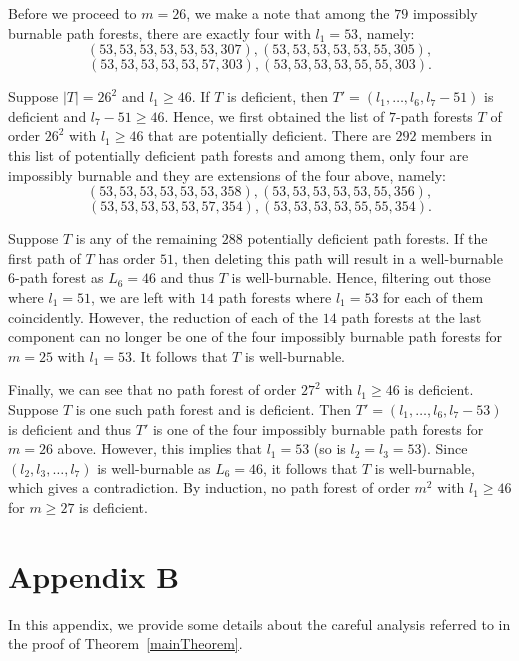 \documentclass[
final
]{dmtcs-episciences}
\theoremstyle{definition}
\theoremstyle{remark}
\begin{document}
Before we proceed to $m=26$, we make a note that among the $79$ impossibly burnable path forests, there are exactly four with $l_1=53$, namely:
$$(53,  53,    53,    53,    53,    53,   307),
(53,  53,    53,    53,    53,    55,   305),$$
$$(53,  53,    53,    53,    53,    57,   303),
(53,  53,    53,    53,    55,    55,   303).$$

Suppose $\vert T\vert=26^2$ and $l_1\geq 46$. If $T$ is deficient, then $T'=(l_1, \ldots, l_6, l_7-51)$ is deficient and $l_7-51\geq 46$. Hence,   we first obtained the list of $7$-path forests $T$ of order $26^2$ with $l_1\geq 46$ that are potentially deficient.
There are $292$ members in this list of potentially deficient path forests and among them, only four are impossibly burnable and they are extensions of the four above, namely:
$$(53,  53,    53,    53,    53,    53,   358),
(53,  53,    53,    53,    53,    55,   356),$$
$$(53,  53,    53,    53,    53,    57,   354),
(53,  53,    53,    53,    55,    55,   354).$$


Suppose $T$ is any of the remaining $288$ potentially deficient path forests. If the first path of $T$ has order $51$, then deleting this path will result in a well-burnable $6$-path forest  as $L_6=46$ and thus $T$ is well-burnable.
Hence, filtering out those where $l_1=51$, we are left with  $14$ path forests where $l_1=53$ for each of them coincidently. However, the reduction of each of the $14$ path forests at the last component can no longer be one of the four impossibly burnable path forests for $m=25$ with $l_1=53$. It follows that $T$ is well-burnable.

Finally, we can see that no path forest of order $27^2$ with $l_1\geq 46$ is deficient. Suppose $T$ is one such path forest and is deficient. Then $T'=(l_1, \ldots, l_6, l_7-53)$ is deficient and thus $T'$ is one of the four impossibly burnable path forests for $m=26$ above. However, this implies that $l_1=53$ (so is $l_2=l_3=53$). Since $(l_2, l_3, \ldots, l_7)$ is well-burnable as $L_6=46$, it follows that $T$ is well-burnable, which gives a contradiction. By induction, no path forest of order $m^2$  with $l_1\geq 46$ for $m\geq 27$   is deficient.



\section*{Appendix B}\label{appendix B}


In this appendix, we provide some details about the careful analysis referred to in the proof of Theorem~\ref{mainTheorem}. 
\end{document}
